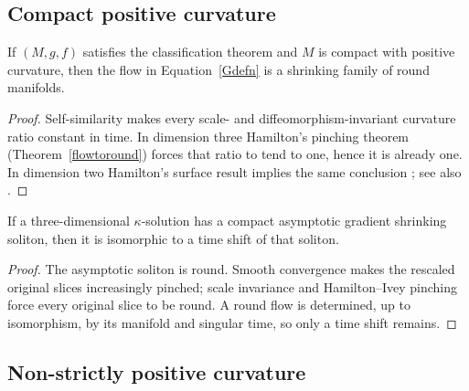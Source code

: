 \subsection{Compact positive curvature}\label{compactcs}

\begin{claim}\label{claim:compact-positive-curvature-round}
If $(M,g,f)$ satisfies the classification theorem and $M$ is
compact with positive curvature, then the flow in
Equation~\ref{Gdefn} is a shrinking family of round manifolds.
\end{claim}
\begin{proof}
\sketch Self-similarity makes every scale- and
diffeomorphism-invariant curvature ratio constant in time. In
dimension three Hamilton's pinching theorem
(Theorem~\ref{flowtoround}) forces that ratio to tend to one, hence
it is already one. In dimension two Hamilton's surface result
implies the same conclusion \cite{Hamiltonsurface}; see also
\cite{ChowKnopf}.
\end{proof}

\begin{corollary}\label{cor:compact-asymptotic-soliton-classification}
\label{compactcase}
If a three-dimensional $\kappa$-solution has a compact asymptotic
gradient shrinking soliton, then it is isomorphic to a time shift of
that soliton.
\end{corollary}
\begin{proof}
\sketch
{}
The asymptotic soliton is round. Smooth convergence makes the
rescaled original slices increasingly pinched; scale invariance and
Hamilton--Ivey pinching force every original slice to be round. A
round flow is determined, up to isomorphism, by its manifold and
singular time, so only a time shift remains.
\end{proof}

\subsection{Non-strictly positive curvature}

